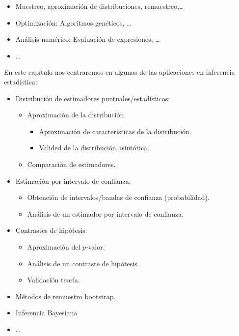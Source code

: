 \documentclass[
]{book}
\theoremstyle{break}
\theoremstyle{definition}
\theoremstyle{definition}
\theoremstyle{definition}
\theoremstyle{remark}
\begin{document}
\begin{itemize}
\item
  Muestreo, aproximación de distribuciones,
  remuestreo,\ldots{}
\item
  Optimización: Algoritmos genéticos, \ldots{}
\item
  Análisis numérico: Evaluación de expresiones, \ldots{}
\item
  \ldots{}
\end{itemize}

En este capítulo nos centraremos en
algunas de las aplicaciones en inferencia estadística:

\begin{itemize}
\item
  Distribución de estimadores puntuales/estadísticos:

  \begin{itemize}
  \item
    Aproximación de la distribución.

    \begin{itemize}
    \item
      Aproximación de características de la distribución.
    \item
      Valided de la distribución asintótica.
    \end{itemize}
  \item
    Comparación de estimadores.
  \end{itemize}
\item
  Estimación por intervalo de confianza:

  \begin{itemize}
  \item
    Obtención de intervalos/bandas de confianza (probabilidad).
  \item
    Análisis de un estimador por intervalo de confianza.
  \end{itemize}
\item
  Contrastes de hipótesis:

  \begin{itemize}
  \item
    Aproximación del \(p\)-valor.
  \item
    Análisis de un contraste de hipótesis.
  \item
    Validación teoría.
  \end{itemize}
\item
  Métodos de remuestro bootstrap.
\item
  Inferencia Bayesiana
\item
  \ldots{}
\end{itemize}
\end{document}
